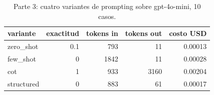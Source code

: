 \begin{table}[H]\centering\caption{Parte 3: cuatro variantes de prompting sobre gpt-4o-mini, 10 casos.}\label{tab:p3}
{\footnotesize\setlength{\tabcolsep}{3.5pt}
\begin{tabular}{lrrrr}
\hline
variante & exactitud & tokens in & tokens out & costo USD \\
\hline
zero\_shot & 0.1 & 793 & 11 & 0.00013 \\
few\_shot & 0 & 1842 & 11 & 0.00028 \\
cot & 1 & 933 & 3160 & 0.00204 \\
structured & 0 & 883 & 61 & 0.00017 \\
\hline
\end{tabular}
}\end{table}
